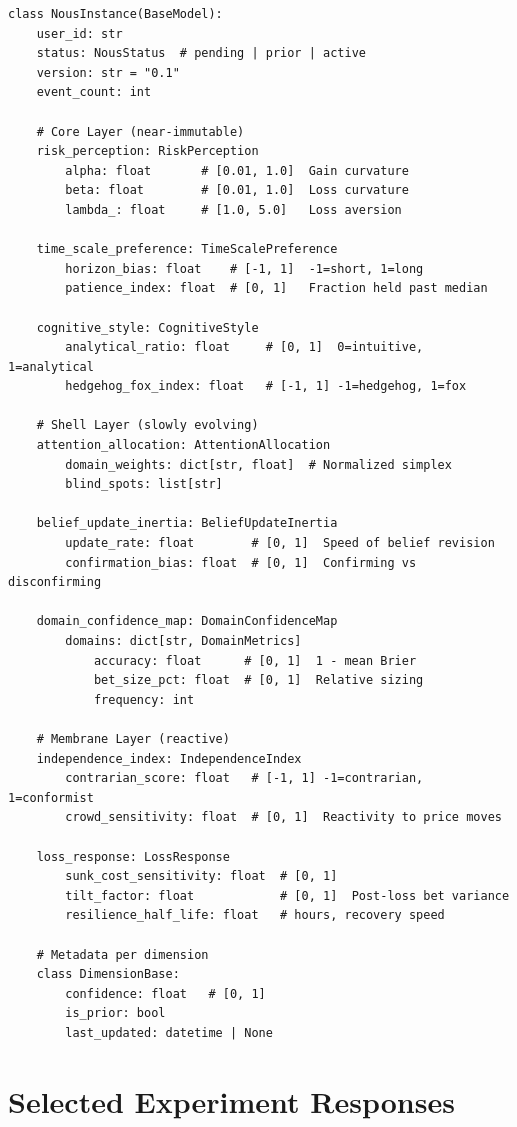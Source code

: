 \documentclass[11pt]{article}
\begin{document}
\begin{small}
\begin{verbatim}
class NousInstance(BaseModel):
    user_id: str
    status: NousStatus  # pending | prior | active
    version: str = "0.1"
    event_count: int

    # Core Layer (near-immutable)
    risk_perception: RiskPerception
        alpha: float       # [0.01, 1.0]  Gain curvature
        beta: float        # [0.01, 1.0]  Loss curvature
        lambda_: float     # [1.0, 5.0]   Loss aversion

    time_scale_preference: TimeScalePreference
        horizon_bias: float    # [-1, 1]  -1=short, 1=long
        patience_index: float  # [0, 1]   Fraction held past median

    cognitive_style: CognitiveStyle
        analytical_ratio: float     # [0, 1]  0=intuitive, 1=analytical
        hedgehog_fox_index: float   # [-1, 1] -1=hedgehog, 1=fox

    # Shell Layer (slowly evolving)
    attention_allocation: AttentionAllocation
        domain_weights: dict[str, float]  # Normalized simplex
        blind_spots: list[str]

    belief_update_inertia: BeliefUpdateInertia
        update_rate: float        # [0, 1]  Speed of belief revision
        confirmation_bias: float  # [0, 1]  Confirming vs disconfirming

    domain_confidence_map: DomainConfidenceMap
        domains: dict[str, DomainMetrics]
            accuracy: float      # [0, 1]  1 - mean Brier
            bet_size_pct: float  # [0, 1]  Relative sizing
            frequency: int

    # Membrane Layer (reactive)
    independence_index: IndependenceIndex
        contrarian_score: float   # [-1, 1] -1=contrarian, 1=conformist
        crowd_sensitivity: float  # [0, 1]  Reactivity to price moves

    loss_response: LossResponse
        sunk_cost_sensitivity: float  # [0, 1]
        tilt_factor: float            # [0, 1]  Post-loss bet variance
        resilience_half_life: float   # hours, recovery speed

    # Metadata per dimension
    class DimensionBase:
        confidence: float   # [0, 1]
        is_prior: bool
        last_updated: datetime | None
\end{verbatim}
\end{small}


\section{Selected Experiment Responses}
\label{app:responses}
\end{document}
